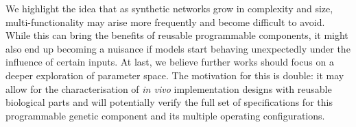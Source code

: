   We highlight the idea that as synthetic networks grow in complexity and size, multi-functionality may arise more frequently and become difficult to avoid.
  While this can bring the benefits of reusable programmable components, it might also end up becoming a nuisance if models start behaving unexpectedly under the influence of certain inputs.
  At last, we believe further works should focus on a deeper exploration of parameter space.
  The motivation for this is double: it may allow for the characterisation of \textit{in vivo} implementation designs with reusable biological parts and will potentially verify the full set of specifications for this programmable genetic component and its multiple operating configurations.
